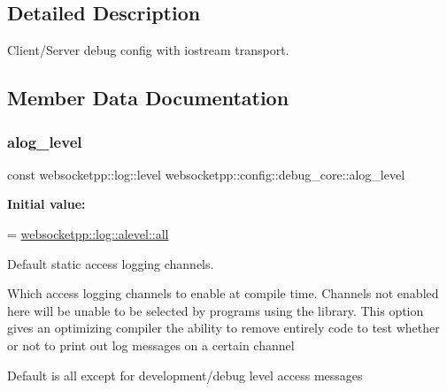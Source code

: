 \subsection{Detailed Description}
Client/\+Server debug config with iostream transport. 

\subsection{Member Data Documentation}
\mbox{\label{structwebsocketpp_1_1config_1_1debug__core_afed6fcfe2f8950b959713c7459e3645c}} 
\subsubsection{\texorpdfstring{alog\+\_\+level}{alog\_level}}
{\footnotesize\ttfamily const websocketpp\+::log\+::level websocketpp\+::config\+::debug\+\_\+core\+::alog\+\_\+level\hspace{0.3cm}{\ttfamily [static]}}

{\bfseries Initial value\+:}
\begin{DoxyCode}
=
        \mbox{\hyperlink{structwebsocketpp_1_1log_1_1alevel_a853aa0b8976e53f3181af3bc398d493e}{websocketpp::log::alevel::all}}
\end{DoxyCode}


Default static access logging channels. 

Which access logging channels to enable at compile time. Channels not enabled here will be unable to be selected by programs using the library. This option gives an optimizing compiler the ability to remove entirely code to test whether or not to print out log messages on a certain channel

Default is all except for development/debug level access messages \mbox{\label{structwebsocketpp_1_1config_1_1debug__core_a2749c03e9600b76c6ee5c1184919f2f7}} 
